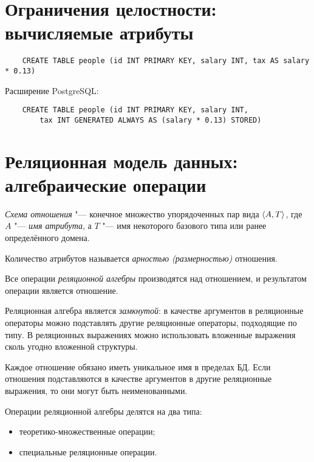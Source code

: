 \section{Ограничения целостности: вычисляемые атрибуты}

\begin{verbatim}
	CREATE TABLE people (id INT PRIMARY KEY, salary INT, tax AS salary * 0.13)
\end{verbatim}

Расширение PostgreSQL:
\begin{verbatim}
	CREATE TABLE people (id INT PRIMARY KEY, salary INT,
		tax INT GENERATED ALWAYS AS (salary * 0.13) STORED)
\end{verbatim}

\section{Реляционная модель данных: алгебраические операции}

\begin{definition}
	\emph{Схема отношения} "--- конечное множество упорядоченных пар вида $ \Braket{A, T} $, где $ A $ "--- \emph{имя атрибута}, а $ T $ "--- имя некоторого базового типа или ранее определённого домена.
\end{definition}

\begin{definition}
	Количество атрибутов называется \emph{арностью (размерностью)} отношения.
\end{definition}

Все операции \emph{реляционной алгебры} производятся над отношением, и результатом операции является отношение.

Реляционная алгебра является \emph{замкнутой}: в качестве аргументов в реляционные операторы можно подставлять другие реляционные операторы, подходящие по типу.
В реляционных выражениях можно использовать вложенные выражения сколь угодно вложенной структуры.

Каждое отношение обязано иметь уникальное имя в пределах БД.
Если отношения подставляются в качестве аргументов в другие реляционные выражения, то они могут быть неименованными.

Операции реляционной алгебры делятся на два типа:
\begin{itemize}
	\item теоретико-множественные операции;
	\item специальные реляционные операции.
\end{itemize}

